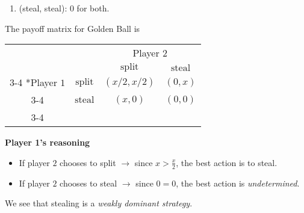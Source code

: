 \begin{eg}
\begin{enumerate}
\begin{itemize}
\begin{enumerate}
				            \item (steal, steal): \(0\) for both.
			            \end{enumerate}
			            The payoff matrix for Golden Ball is
			            \begin{table}[H]
				            \centering
				            \setlength{\extrarowheight}{2pt}
				            \begin{tabular}{cc|c|c|}
					                                      & \multicolumn{1}{c}{} & \multicolumn{2}{c}{Player $2$}                                              \\
					                                      & \multicolumn{1}{c}{} & \multicolumn{1}{c}{$\mathrm{split}$} & \multicolumn{1}{c}{$\mathrm{steal}$} \\\cline{3-4}
					            \multirow{2}*{Player $1$} & $\mathrm{split}$     & $(x/2, x/2)$                         & $(0, x)$                             \\\cline{3-4}
					                                      & $\mathrm{steal}$     & $(x, 0)$                             & $(0, 0)$                             \\\cline{3-4}
				            \end{tabular}
			            \end{table}
		      \end{itemize}

		      \textbf{Player 1's reasoning}
		      \begin{itemize}
			      \item If player \(2\) chooses to split \(\to \) since \(x>\frac{x}{2}\), the best action is to steal.
			      \item If player \(2\) chooses to steal \(\to \) since \(0=0\), the best action is \emph{undetermined}.
		      \end{itemize}

		      We see that stealing is a \emph{weakly dominant strategy}.


\end{enumerate}
\end{eg}
